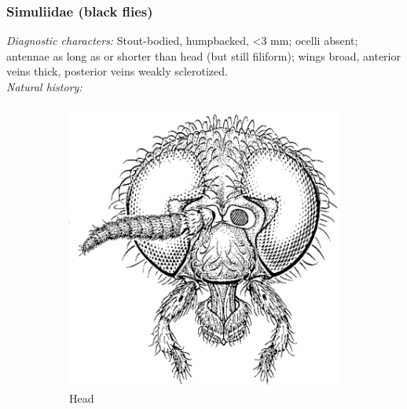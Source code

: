 \documentclass[letterpaper, 11pt]{article}
\begin{document}
\subsubsection{Simuliidae (black flies)}
\noindent{}\textit{Diagnostic characters:} Stout-bodied, humpbacked, \textless3 mm; ocelli absent; antennae as long as or shorter than head (but still filiform); wings broad, anterior veins thick, posterior veins weakly sclerotized.\\

\noindent{}\textit{Natural history:} \\

\begin{figure}[ht!]
    \centering
    \begin{subfigure}[ht!]{0.32\textwidth}
        \includegraphics[width=\textwidth]{SimuliidHead}
        \caption{Head \citep[][Fig. 27.5]{mcalpine1981manual}}
        \label{fig:simuliid1}
    \end{subfigure}
    \qquad 
    \begin{subfigure}[ht!]{0.42\textwidth}

\end{subfigure}
\end{figure}
\end{document}
